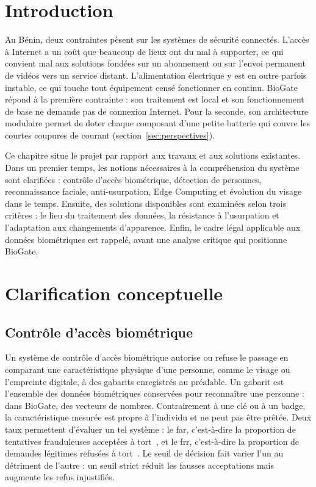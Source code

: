 \section*{Introduction}

\begin{maj}
Au Bénin, deux contraintes pèsent sur les systèmes de sécurité connectés. L'accès à Internet a un coût que beaucoup de lieux ont du mal à supporter, ce qui convient mal aux solutions fondées sur un abonnement ou sur l'envoi permanent de vidéos vers un service distant. L'alimentation électrique y est en outre parfois instable, ce qui touche tout équipement censé fonctionner en continu. BioGate répond à la première contrainte : son traitement est local et son fonctionnement de base ne demande pas de connexion Internet. Pour la seconde, son architecture modulaire permet de doter chaque composant d'une petite batterie qui couvre les courtes coupures de courant (section~\ref{sec:perspectives}).
\end{maj}

Ce chapitre situe le projet par rapport aux travaux et aux solutions existantes. Dans un premier temps, les notions nécessaires à la compréhension du système sont clarifiées : contrôle d'accès biométrique, détection de personnes, reconnaissance faciale, anti-usurpation, Edge Computing et évolution du visage dans le temps. Ensuite, des solutions disponibles sont examinées selon trois critères : le lieu du traitement des données, la résistance à l'usurpation et l'adaptation aux changements d'apparence. Enfin, le cadre légal applicable aux données biométriques est rappelé, avant une analyse critique qui positionne BioGate.

\section{Clarification conceptuelle}

\subsection{Contrôle d'accès biométrique}

Un système de contrôle d'accès biométrique autorise ou refuse le passage en comparant une caractéristique physique d'une personne, comme le visage ou l'empreinte digitale, à des gabarits enregistrés au préalable. Un gabarit est l'ensemble des données biométriques conservées pour reconnaître une personne : dans BioGate, des vecteurs de nombres. Contrairement à une clé ou à un badge, la caractéristique mesurée est propre à l'individu et ne peut pas être prêtée. Deux taux permettent d'évaluer un tel système : le \gls{far}, c'est-à-dire la proportion de tentatives frauduleuses acceptées à tort~\cite{nist_far}, et le \gls{frr}, c'est-à-dire la proportion de demandes légitimes refusées à tort~\cite{nist_frr}. Le seuil de décision fait varier l'un au détriment de l'autre : un seuil strict réduit les fausses acceptations mais augmente les refus injustifiés.

